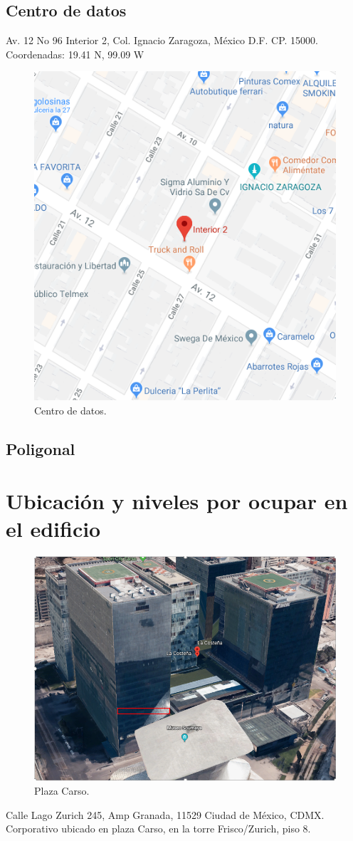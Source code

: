 \documentclass[12pt,letterpaper]{article}
\begin{document}
\subsection{Centro de datos}
Av. 12 No 96 Interior 2, Col. Ignacio Zaragoza, México D.F. CP. 15000.
\\ Coordenadas: 19.41 N, 99.09 W
\begin{figure}[ht]
    \centering
    \includegraphics[width=.8\textwidth]{imagenes/centrodatos.png}
    \caption{Centro de datos.}
\end{figure}

\newpage
\subsection{Poligonal}

\newpage
\section{Ubicación y niveles por ocupar en el edificio}
\begin{figure}[ht]
    \centering
    \includegraphics[width=.8\textwidth]{imagenes/edificios.png}
    \caption{Plaza Carso.}
\end{figure}
Calle Lago Zurich 245, Amp Granada, 11529 Ciudad de México, CDMX.
\\
Corporativo ubicado en plaza Carso, en la torre Frisco/Zurich, piso 8.
\end{document}
